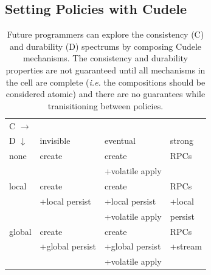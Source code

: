 
\subsection{Setting Policies with Cudele}
\label{sec:setting-policies-with-cudele}

\begin{table}[t]
\begin{center}
\caption{Future programmers can explore the consistency (C) and
durability (D) spectrums by composing Cudele mechanisms. The consistency
and durability properties are not guaranteed until all mechanisms in the cell
are complete ({\it i.e.} the compositions should be considered atomic) and there are
no guarantees while tranisitioning between policies. \label{table:spectrum}}
\begin{tabular}{ l | l | l | l }
  C \(\rightarrow\) &&& \\  
  D \(\downarrow\)  	     & invisible         & eventual        & strong  \\\hline
  none                       & create            & create          & RPCs    \\
                             &                   & +volatile apply &         \\\hdashline
  local                      & create            & create          & RPCs    \\
                             & +local persist    & +local persist  & +local  \\
                             &                   & +volatile apply &  persist\\\hdashline
  global                     & create            & create          & RPCs    \\
                             & +global persist   & +global persist & +stream \\
                             &                   & +volatile apply &         \\
\end{tabular}
\end{center}
\end{table}

